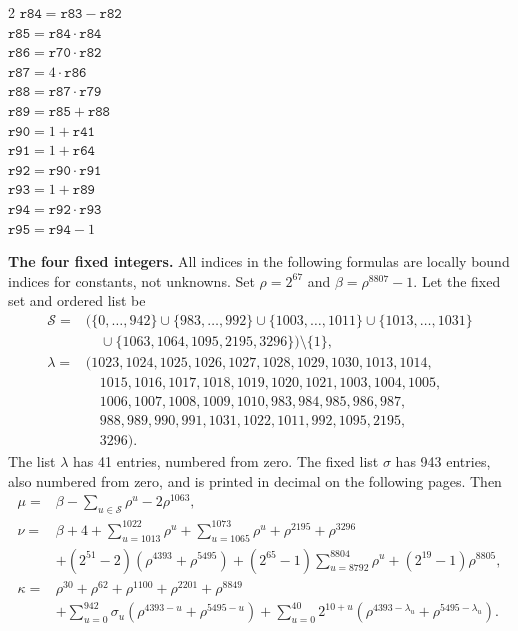 \documentclass[10pt]{article}
\begin{document}
\begin{multicols}{2}
\(\mathtt{r84} = \mathtt{r83} - \mathtt{r82}\)\\
\(\mathtt{r85} = \mathtt{r84} \cdot \mathtt{r84}\)\\
\(\mathtt{r86} = \mathtt{r70} \cdot \mathtt{r82}\)\\
\(\mathtt{r87} = 4 \cdot \mathtt{r86}\)\\
\(\mathtt{r88} = \mathtt{r87} \cdot \mathtt{r79}\)\\
\(\mathtt{r89} = \mathtt{r85} + \mathtt{r88}\)\\
\(\mathtt{r90} = 1 + \mathtt{r41}\)\\
\(\mathtt{r91} = 1 + \mathtt{r64}\)\\
\(\mathtt{r92} = \mathtt{r90} \cdot \mathtt{r91}\)\\
\(\mathtt{r93} = 1 + \mathtt{r89}\)\\
\(\mathtt{r94} = \mathtt{r92} \cdot \mathtt{r93}\)\\
\(\mathtt{r95} = \mathtt{r94} - 1\)\\
\end{multicols}
\clearpage
\textbf{The four fixed integers.} All indices in the following formulas are
locally bound indices for constants, not unknowns. Set \(\rho=2^{67}\) and
\(\beta=\rho^{8807}-1\). Let the fixed set and ordered list be
\[
\begin{aligned}
\mathcal S={}&\bigl(\{0,\ldots,942\}\cup\{983,\ldots,992\}\cup
\{1003,\ldots,1011\}\cup\{1013,\ldots,1031\}\\
&\quad\cup\{1063,1064,1095,2195,3296\}\bigr)\setminus\{1\},\\
\lambda={}&(1023,1024,1025,1026,1027,1028,1029,1030,1013,1014,\\
&\quad 1015,1016,1017,1018,1019,1020,1021,1003,1004,1005,\\
&\quad 1006,1007,1008,1009,1010,983,984,985,986,987,\\
&\quad 988,989,990,991,1031,1022,1011,992,1095,2195,\\
&\quad 3296).
\end{aligned}
\]
The list \(\lambda\) has 41 entries, numbered from zero. The fixed list
\(\sigma\) has 943 entries, also numbered from zero, and is printed in
decimal on the following pages. Then
\[
\begin{aligned}
\mu={}&\beta-\sum_{u\in\mathcal S}\rho^u-2\rho^{1063},\\
\nu={}&\beta+4+\sum_{u=1013}^{1022}\rho^u+\sum_{u=1065}^{1073}\rho^u
 +\rho^{2195}+\rho^{3296}\\
&+(2^{51}-2)(\rho^{4393}+\rho^{5495})
 +(2^{65}-1)\sum_{u=8792}^{8804}\rho^u+(2^{19}-1)\rho^{8805},\\
\kappa={}&\rho^{30}+\rho^{62}+\rho^{1100}+\rho^{2201}+\rho^{8849}\\
&+\sum_{u=0}^{942}\sigma_u(\rho^{4393-u}+\rho^{5495-u})
 +\sum_{u=0}^{40}2^{10+u}(\rho^{4393-\lambda_u}+\rho^{5495-\lambda_u}).
\end{aligned}
\]
\end{document}
